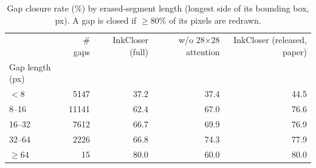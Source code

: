 \begin{table}
\caption{Gap closure rate (\%) by erased-segment length (longest side of its bounding box, px). A gap is closed if $\geq$80\% of its pixels are redrawn.}
\label{tab:gap_length}
\begin{tabular}{lrrrr}
\toprule
 & \# gaps & InkCloser (full) & w/o 28×28 attention & InkCloser (released, paper) \\
Gap length (px) &  &  &  &  \\
\midrule
$<$8 & 5147 & 37.2 & 37.4 & 44.5 \\
8--16 & 11141 & 62.4 & 67.0 & 76.6 \\
16--32 & 7612 & 66.7 & 69.9 & 76.9 \\
32--64 & 2226 & 66.8 & 74.3 & 77.9 \\
$\geq$64 & 15 & 80.0 & 60.0 & 80.0 \\
\bottomrule
\end{tabular}
\end{table}
